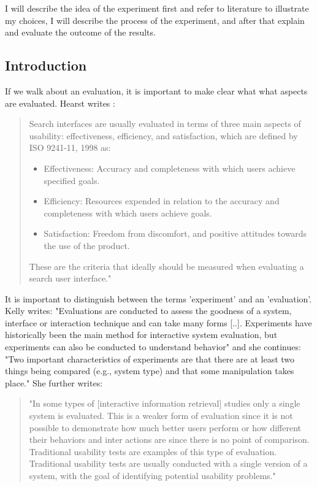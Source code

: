 \documentclass[11pt]{report}
\begin{document}
I will describe the idea of the experiment first and refer to literature to illustrate my choices, I will describe the process of the experiment, and after that explain and evaluate the outcome of the results.

\subsection{Introduction}
  If we walk about an evaluation, it is important to make clear what what aspects are evaluated. Hearst writes \cite{Hearst2009}:
  \begin{quote}
  Search interfaces are usually evaluated in terms of three main aspects of usability: effectiveness, efficiency, and satisfaction, which are defined by ISO 9241-11, 1998 \cite{ISO} as:
\begin{itemize}
	\item Effectiveness: Accuracy and completeness with which users achieve specified goals.
	\item Efficiency: Resources expended in relation to the accuracy and completeness with which users achieve goals.
	\item Satisfaction: Freedom from discomfort, and positive attitudes towards the use of the product.
\end{itemize}
These are the criteria that ideally should be measured when evaluating a search user interface."
\end{quote}

It is important to distinguish between the terms 'experiment' and an 'evaluation'. Kelly \cite{Kelly2007} writes: "Evaluations are conducted to assess the goodness of a system, interface or interaction technique and can take many forms [..]. Experiments have historically been the main method for interactive system evaluation, but experiments can also be conducted to understand behavior" and she continues: "Two important characteristics of experiments are that there are at least two things being compared (e.g., system type) and that some manipulation takes place." She further writes:
\begin{quote}
"In some types of [interactive information retrieval] studies only a single system is evaluated. This is a weaker form of evaluation since it is not possible to demonstrate how much better users perform or how different their behaviors and inter actions are since there is no point of comparison. Traditional usability tests are examples of this type of evaluation. Traditional usability tests are usually conducted with a single version of a system, with the goal of identifying potential usability problems."	
\end{quote}
\end{document}
